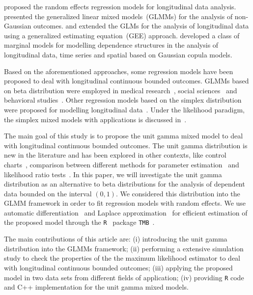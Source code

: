 \documentclass[a4paper,12pt]{article}
\begin{document}
\cite{laird1982} proposed the random effects regression models for
longitudinal data analysis. \cite{Breslow:1993} presented the
generalized linear mixed models~(GLMMs) for the analysis of non-Gaussian
outcomes. \cite{LiangZeger:1986} and \cite{Zeger:1988} extended the GLMs
for the analysis of longitudinal data using a generalized estimating
equation~(GEE) approach. \cite{masarotto2012gaussian} developed a class
of marginal models for modelling dependence structures in the analysis
of longitudinal data, time series and spatial based on Gaussian copula
models.

Based on the aforementioned approaches, some regression models have been
proposed to deal with longitudinal continuous bounded outcomes. GLMMs
based on beta distribution were employed in medical
research~\citep{hunger2012}, social
sciences~\citep{Bonatbetamix,Bonat:2015b} and behavioral
studies~\citep{verkuilen2012mixed}. Other regression models based on the
simplex distribution were proposed for modelling longitudinal
data~\citep{song2000marginal,song2004,qiu2008simplex}. Under the
likelihood paradigm, the simplex mixed models with applications is
discussed in~\cite{bonatetal2018simplex}.

The main goal of this study is to propose the unit gamma mixed model to
deal with longitudinal continuous bounded outcomes. The unit gamma
distribution is new in the literature and has been explored in other
contexts, like control charts~\citep{lee2019}, comparison between
different methods for parameter estimation~\citep{dey2019} and
likelihood ratio tests~\citep{guedes2020}. In this paper, we will
investigate the unit gamma distribution as an alternative to beta
distributions for the analysis of dependent data bounded on the interval
$(0,1)$. We considered this distribution into the GLMM framework in
order to fit regression models with random effects. We use automatic
differentiation~\citep{griewank2008} and Laplace
approximation~\citep{tierney1986} for efficient estimation of the
proposed model through the \texttt{R}~\citep{R} package
\texttt{TMB}~\citep{kristensen2016}.

The main contributions of this article are: (i) introducing the unit
gamma distribution into the GLMMs framework; (ii) performing a extensive
simulation study to check the properties of the the maximum likelihood
estimator to deal with longitudinal continuous bounded outcomes; (iii)
applying the proposed model in two data sets from different fields of
application; (iv) providing \texttt{R} code and \textrm{C++}
implementation for the unit gamma mixed models.
\end{document}
